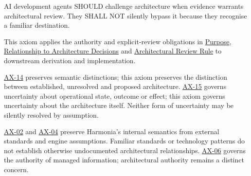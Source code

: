\label{rad:axioms:845}

AI development agents SHOULD challenge architecture when evidence warrants architectural review. They SHALL NOT silently bypass it because they recognise a familiar destination.

\label{rad:axioms:849}

This axiom applies the authority and explicit-review obligations in \href{https://github.com/fhirfactory/harmonia/blob/98410db60155198a75f74c79d98060070209faa1/docs/markdown/governance/architectural-axioms.md\#1-purpose}{Purpose}, \href{https://github.com/fhirfactory/harmonia/blob/98410db60155198a75f74c79d98060070209faa1/docs/markdown/governance/architectural-axioms.md\#6-relationship-to-architecture-decisions}{Relationship to Architecture Decisions} and \href{https://github.com/fhirfactory/harmonia/blob/98410db60155198a75f74c79d98060070209faa1/docs/markdown/governance/architectural-axioms.md\#7-architectural-review-rule}{Architectural Review Rule} to downstream derivation and implementation.

\label{rad:axioms:854}

\href{https://github.com/fhirfactory/harmonia/blob/98410db60155198a75f74c79d98060070209faa1/docs/markdown/governance/architectural-axioms.md\#ax-14}{AX-14} preserves semantic distinctions; this axiom preserves the distinction between established, unresolved and proposed architecture. \href{https://github.com/fhirfactory/harmonia/blob/98410db60155198a75f74c79d98060070209faa1/docs/markdown/governance/architectural-axioms.md\#ax-15}{AX-15} governs uncertainty about operational state, outcome or effect; this axiom governs uncertainty about the architecture itself. Neither form of uncertainty may be silently resolved by assumption.

\label{rad:axioms:862}

\href{https://github.com/fhirfactory/harmonia/blob/98410db60155198a75f74c79d98060070209faa1/docs/markdown/governance/architectural-axioms.md\#ax-02}{AX-02} and \href{https://github.com/fhirfactory/harmonia/blob/98410db60155198a75f74c79d98060070209faa1/docs/markdown/governance/architectural-axioms.md\#ax-04}{AX-04} preserve Harmonia's internal semantics from external standards and engine assumptions. Familiar standards or technology patterns do not establish otherwise undocumented architectural relationships. \href{https://github.com/fhirfactory/harmonia/blob/98410db60155198a75f74c79d98060070209faa1/docs/markdown/governance/architectural-axioms.md\#ax-06}{AX-06} governs the authority of managed information; architectural authority remains a distinct concern.

